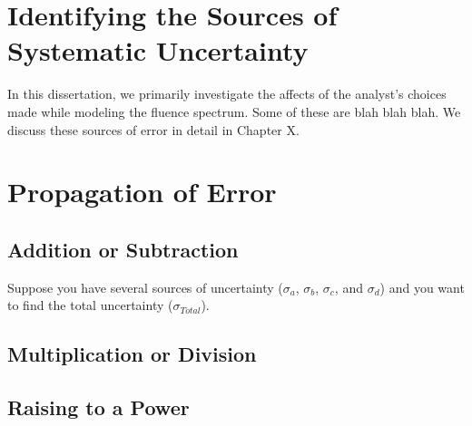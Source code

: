 \documentclass[11pt, oneside]{article}   	%
\begin{document}

\section{Identifying the Sources of Systematic Uncertainty}
In this dissertation, we primarily investigate the affects of the analyst's choices made while modeling the fluence spectrum. Some of these are blah blah blah. We discuss these sources of error in detail in Chapter X. 



\section{Propagation of Error}
\subsection{Addition or Subtraction}
Suppose you have several sources of uncertainty ($\sigma_a$, $\sigma_b$, $\sigma_c$, and $\sigma_d$) and you want to find the total uncertainty ($\sigma_{Total}$). 


\subsection{ Multiplication or Division}
\subsection{Raising to a Power}
\end{document}
